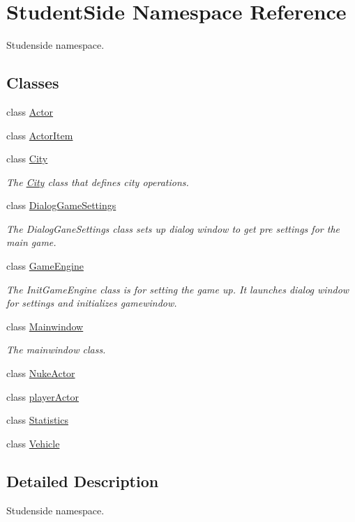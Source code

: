 \hypertarget{namespace_student_side}{\section{Student\-Side Namespace Reference}
\label{namespace_student_side}
}


Studenside namespace.  


\subsection*{Classes}
\begin{DoxyCompactItemize}
\item 
class \hyperlink{class_student_side_1_1_actor}{Actor}
\item 
class \hyperlink{class_student_side_1_1_actor_item}{Actor\-Item}
\item 
class \hyperlink{class_student_side_1_1_city}{City}
\begin{DoxyCompactList}\small\item\em The \hyperlink{class_student_side_1_1_city}{City} class that defines city operations. \end{DoxyCompactList}\item 
class \hyperlink{class_student_side_1_1_dialog_game_settings}{Dialog\-Game\-Settings}
\begin{DoxyCompactList}\small\item\em The Dialog\-Gane\-Settings class sets up dialog window to get pre settings for the main game. \end{DoxyCompactList}\item 
class \hyperlink{class_student_side_1_1_game_engine}{Game\-Engine}
\begin{DoxyCompactList}\small\item\em The Init\-Game\-Engine class is for setting the game up. It launches dialog window for settings and initializes gamewindow. \end{DoxyCompactList}\item 
class \hyperlink{class_student_side_1_1_mainwindow}{Mainwindow}
\begin{DoxyCompactList}\small\item\em The mainwindow class. \end{DoxyCompactList}\item 
class \hyperlink{class_student_side_1_1_nuke_actor}{Nuke\-Actor}
\item 
class \hyperlink{class_student_side_1_1player_actor}{player\-Actor}
\item 
class \hyperlink{class_student_side_1_1_statistics}{Statistics}
\item 
class \hyperlink{class_student_side_1_1_vehicle}{Vehicle}
\end{DoxyCompactItemize}


\subsection{Detailed Description}
Studenside namespace. 